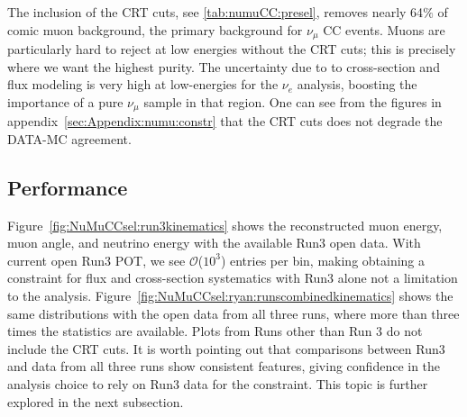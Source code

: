 \par The inclusion of the CRT cuts, see \cref{tab:numuCC:presel}, removes nearly 64$\%$ of comic muon background, the primary background for $\nu_{\mu}$ CC events. Muons are particularly hard to reject at low energies without the CRT cuts; this is precisely where we want the highest purity. The uncertainty due to to cross-section and flux modeling is very high at low-energies for the $\nu_e$ analysis, boosting the importance of a pure $\nu_{\mu}$ sample in that region. One can see from the figures in appendix~\ref{sec:Appendix:numu:constr} that the CRT cuts does not degrade the DATA-MC agreement.

\subsection{Performance}
\label{sssec:NuMUCCsel:performance}
                    
\par Figure~\ref{fig:NuMuCCsel:run3kinematics} shows the reconstructed muon energy, muon angle, and neutrino energy with the available Run3 open data. With current open Run3 POT, we see $\mathcal{O}$($10^3$) entries per bin, making obtaining a constraint for flux and cross-section systematics with Run3 alone not a limitation to the analysis. Figure~\ref{fig:NuMuCCsel:ryan:runscombinedkinematics} shows the same distributions with the open data from all three runs, where more than three times the statistics are available. Plots from Runs other than Run 3 do not include the CRT cuts. It is worth pointing out that comparisons between Run3 and data from all three runs show consistent features, giving confidence in the analysis choice to rely on Run3 data for the constraint. This topic is further explored in the next subsection.

